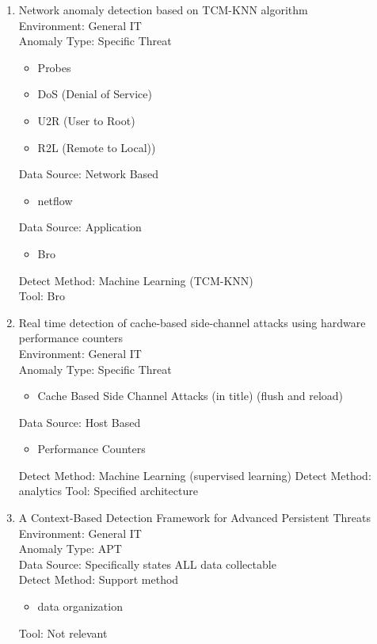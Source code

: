 \begin{enumerate}
    
    \item
    Network anomaly detection based on TCM-KNN algorithm\cite{li2007network}\\
    Environment: General IT\\
    Anomaly Type: Specific Threat
    \begin{itemize}
        \item Probes
        \item DoS (Denial of Service)
        \item U2R (User to Root)
        \item R2L (Remote to Local))\\
    \end{itemize}
    Data Source: Network Based
    \begin{itemize}
        \item netflow
    \end{itemize}
    Data Source: Application
    \begin{itemize}
        \item Bro
    \end{itemize}
    Detect Method:  Machine Learning (TCM-KNN)\\
    Tool: Bro
    
    \item
    Real time detection of cache-based side-channel attacks using hardware performance counters\cite{chiappetta2016real}\\
    Environment: General IT\\
    Anomaly Type: Specific Threat
    \begin{itemize}
        \item Cache Based Side Channel Attacks (in title) (flush and reload)
    \end{itemize}
    Data Source: Host Based
    \begin{itemize}
        \item Performance Counters
    \end{itemize}
    Detect Method: Machine Learning (supervised learning) 
    Detect Method: analytics
    Tool: Specified architecture
    
    \item
    A Context-Based Detection Framework for Advanced Persistent Threats\cite{giura2012context}\\
    Environment: General IT\\
    Anomaly Type: APT\\
    Data Source: Specifically states ALL data collectable \\
    Detect Method: Support method
    \begin{itemize}
        \item data organization
    \end{itemize}
    Tool: Not relevant
    

\end{enumerate}
